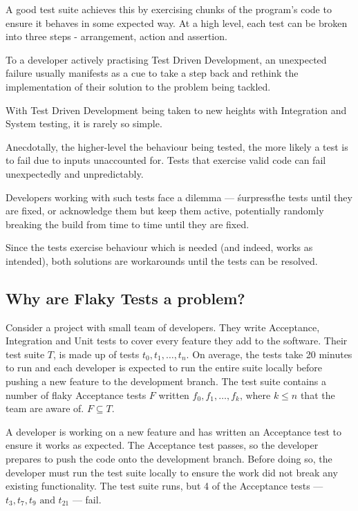 A good test suite achieves this by exercising chunks of the program's code to ensure it behaves in some expected way. At a high level, each test can be broken into three steps - arrangement, action and assertion.

To a developer actively practising Test Driven Development, an unexpected failure usually manifests as a cue to take a step back and rethink the implementation of their solution to the problem being tackled.

With Test Driven Development being taken to new heights with Integration and System testing, it is rarely so simple.

Anecdotally, the higher-level the behaviour being tested, the more likely a test is to fail due to inputs unaccounted for. Tests that exercise valid code can fail unexpectedly and unpredictably.

Developers working with such tests face a dilemma --- \'surpress\' the tests until they are fixed, or acknowledge them but keep them active, potentially randomly breaking the build from time to time until they are fixed.

Since the tests exercise behaviour which is needed (and indeed, works as intended), both solutions are workarounds until the tests can be resolved.

\subsection{Why are Flaky Tests a problem?}

Consider a project with small team of developers. They write Acceptance, Integration and Unit tests to cover every feature they add to the software. Their test suite $T$, is made up of tests $t_{0}, t_{1}, \dots, t_{n}$. On average, the tests take 20 minutes to run and each developer is expected to run the entire suite locally before pushing a new feature to the development branch. The test suite contains a number of flaky Acceptance tests $F$ written $f_{0}, f_{1}, \dots, f_{k} \text{, where $k \leq n$}$ that the team are aware of. $F \subseteq T$.

A developer is working on a new feature and has written an Acceptance test to ensure it works as expected. The Acceptance test passes, so the developer prepares to push the code onto the development branch. Before doing so, the developer must run the test suite locally to ensure the work did not break any existing functionality. The test suite runs, but 4 of the Acceptance tests --- $t_{3}, t_{7}, t_{9} \text{ and } t_{21}$ --- fail.

